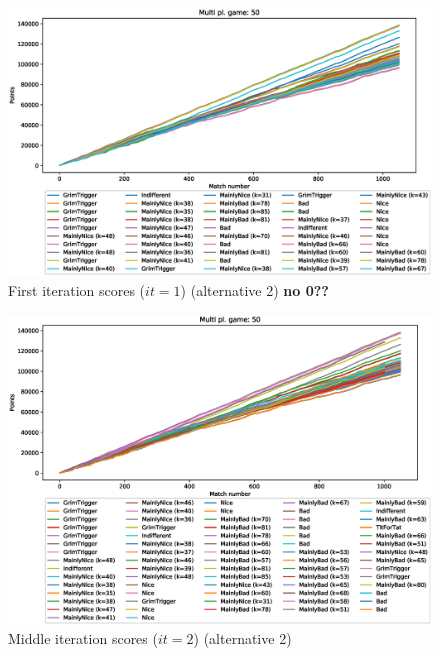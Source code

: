 \documentclass[journal,10pt,twoside]{IEEEtran}
\begin{document}
\begin{figure}[!ht]
    \centering
    \includegraphics[width=1\columnwidth]{../img/cipdmp-incr/alt2/cipdmp-scores-increasing-pop-50-r1}
    \caption{First iteration scores ($it=1$) (alternative 2) \textbf{no 0??}}
    \label{fig:incrCFI2}
\end{figure}

\begin{figure}[!ht]
    \centering
    \includegraphics[width=1\columnwidth]{../img/cipdmp-incr/alt2/cipdmp-scores-increasing-pop-50-r2}
    \caption{Middle iteration scores ($it=2$) (alternative 2)}
    \label{fig:incrCMI2}
\end{figure}
\end{document}

